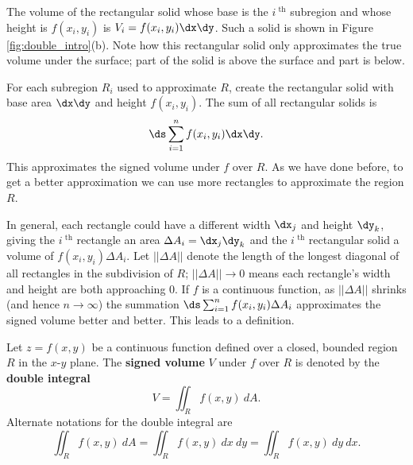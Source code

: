 The volume of the rectangular solid whose base is the $i^\text{ th}$ subregion and whose height is $f(x_i,y_i)$ is $V_i=f(x_i,y_i)\dx\dy$. Such a  solid is shown in Figure \ref{fig:double_intro}(b). Note how this rectangular solid only approximates the true volume under the surface; part of the solid is above the surface and part is below.

For each subregion $R_i$ used to approximate $R$, create the rectangular solid with base area $\dx\dy$ and height $f(x_i,y_i)$. 
The sum of all rectangular solids is $$\ds \sum_{i=1}^n f(x_i,y_i)\dx\dy.$$ This approximates the signed volume under $f$ over $R$. As we have done before, to get a better approximation we can use more rectangles to approximate the region $R$.

In general, each rectangle could have a different width $\dx_j$ and height $\dy_k$, giving the $i^\text{ th}$ rectangle an area $\Delta A_i = \dx_j\dy_k$ and the $i^\text{ th}$ rectangular solid a volume of $f(x_i,y_i)\Delta A_i$. Let $||\Delta A||$ denote the length of the longest diagonal of all rectangles in the subdivision of $R$; $||\Delta A||\to 0$ means each rectangle's width and height are both approaching 0. If $f$ is a continuous function, as $||\Delta A||$ shrinks (and hence $n\to\infty$) the summation $\ds \sum_{i=1}^n f(x_i,y_i)\Delta A_i$ approximates the signed volume better and better. This leads to a definition.


{Let $z=f(x,y)$ be a continuous function defined over a closed, bounded region $R$ in the $x$-$y$ plane. The \textbf{signed volume} $V$ under $f$ over $R$ is denoted by the \textbf{double integral}
$$V = \iint_R f(x,y)\ dA.$$
Alternate notations for the double integral are
$$\iint_R f(x,y)\ dA=\iint_R f(x,y)\ dx\ dy=\iint_R f(x,y)\ dy\ dx.$$
}

